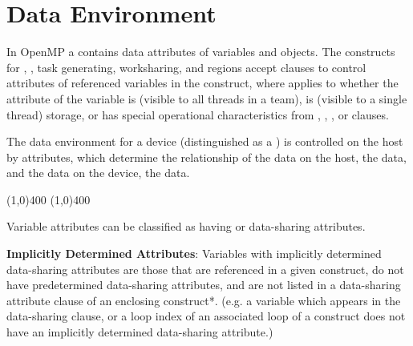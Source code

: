 \pagebreak
\chapter{Data Environment}
\label{chap:data_environment}
In OpenMP a  contains data attributes of variables and
objects.  The constructs for , , task generating, worksharing,
 and  regions accept clauses to control  attributes
of referenced variables in the construct, where  applies to
whether the attribute of the variable is 
(visible to all threads in a team), is  (visible to a single thread)
storage, or has special operational characteristics 
from , , , or  clauses.

The data environment for a device (distinguished as a )
is controlled on the host by  attributes, which determine the
relationship of the data on the host, the  data, and the data on the
device, the  data.

\line(1,0){400}
\line(1,0){400}

Variable attributes can be classified as having 
 or  data-sharing attributes.

\textbf{Implicitly Determined Attributes}:\newline
Variables with implicitly determined data-sharing attributes are those
that are referenced in a given construct, do not have predetermined
data-sharing attributes, and are not listed in a data-sharing
attribute clause of an enclosing construct*.
(e.g. a variable which appears in the data-sharing  clause,
or a loop index of an associated loop of a  construct does
not have an implicitly determined data-sharing attribute.)

